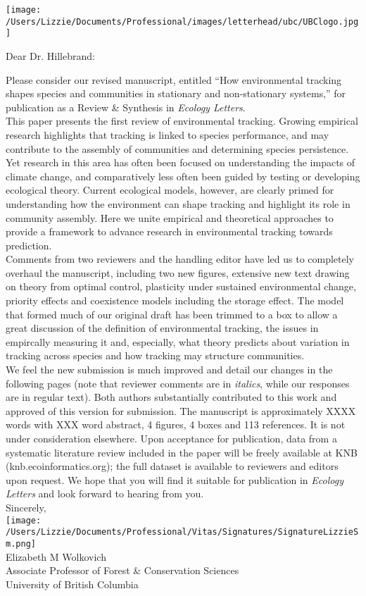 \documentclass[11pt,a4paper]{letter}
\begin{document}
\begin{letter}{}
\texttt{[image: /Users/Lizzie/Documents/Professional/images/letterhead/ubc/UBClogo.jpg]}
\opening{Dear Dr. Hillebrand:}
Please consider our revised manuscript, entitled ``How environmental tracking shapes species and communities in stationary and non-stationary systems,'' for publication as a Review \& Synthesis in \emph{Ecology Letters}. 
\vspace{1.5ex}\\
This paper presents the first review of environmental tracking. Growing empirical research highlights that tracking is linked to species performance, and may contribute to the assembly of communities and determining species persistence. Yet research in this area has often been focused on understanding the impacts of climate change, and comparatively less often been guided by testing or developing ecological theory. Current ecological models, however, are clearly primed for understanding how the environment can shape tracking and highlight its role in community assembly. Here we unite empirical and theoretical approaches to provide a framework to advance research in environmental tracking towards prediction. 
\vspace{1.5ex}\\
Comments from two reviewers and the handling editor have led us to completely overhaul the manuscript, including two new figures, extensive new text drawing on theory from optimal control, plasticity under sustained environmental change, priority effects and coexistence models including the storage effect. The model that formed much of our original draft has been trimmed to a box to allow a great discussion of the definition of environmental tracking, the issues in empircally measuring it and, especially, what theory predicts about variation in tracking across species and how tracking may structure communities. 
\vspace{1.5ex}\\
We feel the new submission is much improved and detail our changes in the following pages (note that reviewer comments are in \emph{italics}, while our responses are in regular text). Both authors substantially contributed to this work and approved of this version for submission. The manuscript is approximately XXXX words with XXX word abstract, 4 figures,  4 boxes and 113 references. It is not under consideration elsewhere. Upon acceptance for publication, data from a systematic literature review included in the paper will be freely available at KNB (knb.ecoinformatics.org); the full dataset is available to reviewers and editors upon request. We hope that you will find it suitable for publication in \emph{Ecology Letters} and look forward to hearing from you.
\vspace{1.5ex}\\
Sincerely,\\

\texttt{[image: /Users/Lizzie/Documents/Professional/Vitas/Signatures/SignatureLizzieSm.png]} \\

Elizabeth M Wolkovich\\
Associate Professor of Forest \& Conservation Sciences\\ 
University of British Columbia
\end{letter}
\end{document}
